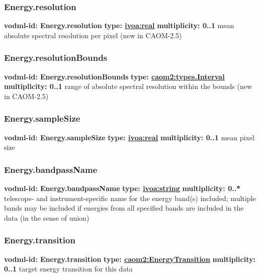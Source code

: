     \subsubsection{Energy.resolution}
      \textbf{vodml-id: Energy.resolution} \newline
      \textbf{type: \hyperref[sect:ivoa]{ivoa:real}} \newline
      \textbf{multiplicity: 0..1} \newline
      mean absolute spectral resolution per pixel (new in CAOM-2.5)

    \subsubsection{Energy.resolutionBounds}
      \textbf{vodml-id: Energy.resolutionBounds} \newline
      \textbf{type: \hyperref[sect:types.Interval]{caom2:types.Interval}} \newline
      \textbf{multiplicity: 0..1} \newline
      range of absolute spectral resolution within the bounds (new in CAOM-2.5)

    \subsubsection{Energy.sampleSize}
      \textbf{vodml-id: Energy.sampleSize} \newline
      \textbf{type: \hyperref[sect:ivoa]{ivoa:real}} \newline
      \textbf{multiplicity: 0..1} \newline
      mean pixel size

    \subsubsection{Energy.bandpassName}
      \textbf{vodml-id: Energy.bandpassName} \newline
      \textbf{type: \hyperref[sect:ivoa]{ivoa:string}} \newline
      \textbf{multiplicity: 0..*} \newline
      telescope- and instrument-specific name for the energy band(s) included; multiple bands may be included if energies from all specified bands are included in the data (in the sense of union)

    \subsubsection{Energy.transition}
      \textbf{vodml-id: Energy.transition} \newline
      \textbf{type: \hyperref[sect:EnergyTransition]{caom2:EnergyTransition}} \newline
      \textbf{multiplicity: 0..1} \newline
      target energy transition for this data

